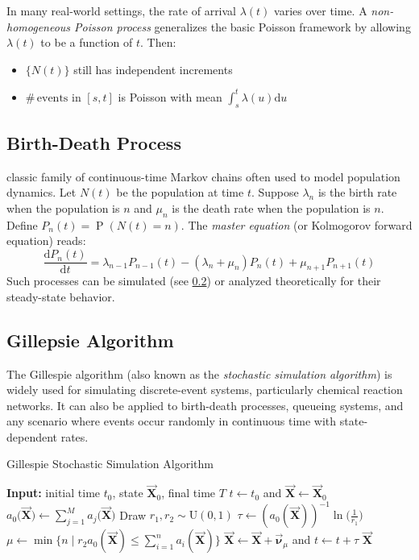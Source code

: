 \documentclass[11pt, headings=standardclasses, parskip=half, twoside]{scrartcl}
\newcommand{\vect}[1]{\vec{\boldsymbol{#1}}}
\newcommand{\dif}{\mathrm{d}}
\newcommand{\Prob}{\operatorname{P}}
\newcommand{\numof}{\ensuremath{\# \,}} %
\begin{document}
In many real-world settings, the rate of arrival \(\lambda(t)\) varies over time.
A \emph{non-homogeneous Poisson process} generalizes the basic Poisson framework by allowing \(\lambda(t)\) to be a function of \(t\).
Then:
\begin{itemize}[before={\parskip = 0em}, nosep]
  \item \(\{N(t)\}\) still has independent increments
  \item \(\numof \text{events}\) in \([s, t]\) is Poisson with mean \(\int_s^t \lambda(u) \dif u\)
\end{itemize}


\subsection{Birth-Death Process}\label{subsec:birth-death}
classic family of continuous-time Markov chains often used to model population dynamics.
Let \(N(t)\) be the population at time \(t\). 
Suppose \(\lambda_n\) is the birth rate when the population is \(n\) and \(\mu_n\) is the death rate when the population is \(n\). 
Define \(P_n(t) = \Prob(N(t)=n)\).
The \emph{master equation} (or Kolmogorov forward equation) reads:
\[
\frac{\dif P_n(t)}{\dif t} = \lambda_{n-1} P_{n-1}(t) - (\lambda_n + \mu_n) P_n(t) + \mu_{n+1} P_{n+1}(t)
\]
Such processes can be simulated (see \ref{subsec:gillespie}) or analyzed theoretically for their steady-state behavior.

\subsection{Gillepsie Algorithm}\label{subsec:gillespie}

The Gillespie algorithm (also known as the \emph{stochastic simulation algorithm}) is widely used for simulating discrete-event systems, particularly chemical reaction networks. 
It can also be applied to birth-death processes, queueing systems, and any scenario where events occur randomly in continuous time with state-dependent rates.

\begin{algorithm}
  \caption{Gillespie Stochastic Simulation Algorithm}
  \begin{algorithmic}[1]
    \State \textbf{Input:} initial time $t_0$, state $\vect{X}_0$, final time $T$
    \State $t \gets t_0$ and $\vect{X} \gets \vect{X}_0$
      \State $a_0\big(\vect{X}\big) \gets \sum_{j=1}^M a_j\big(\vect{X}\big)$
      \State Draw $r_1, r_2 \sim \mathrm{U}(0,1)$
      \State $\tau \gets (a_0(\vect{X}))^{-1} \ln\bigl(\frac{1}{r_1}\bigr)$ 
      \State $\mu \gets \min \bigl\{n \mid r_2 a_0(\vect{X}) \leq \sum_{i=1}^n a_i(\vect{X})\bigr\}$ 
      \State $\vect{X}\gets \vect{X} + \vect{\nu}_\mu$ and $t \gets t + \tau$
    \EndWhile
    \State \Return $\vect{X}$
  \end{algorithmic}
  \end{algorithm}
\end{document}
